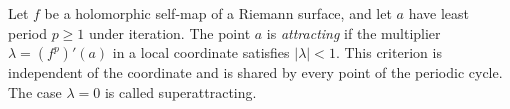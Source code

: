 
Let $f$ be a holomorphic self-map of a Riemann surface, and let $a$ have least period $p\ge1$ under iteration. The point $a$ is \emph{attracting} if the multiplier $\lambda=(f^p)'(a)$ in a local coordinate satisfies $|\lambda|<1$. This criterion is independent of the coordinate and is shared by every point of the periodic cycle. The case $\lambda=0$ is called superattracting.
